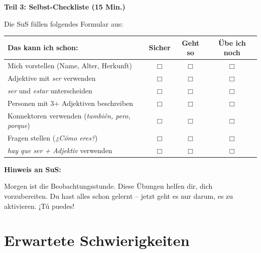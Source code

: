 \documentclass[11pt,a4paper]{article}
\begin{document}
\begin{onlinebox}
\vspace{1em}
\textbf{Teil 3: Selbst-Checkliste (15 Min.)}

Die SuS füllen folgendes Formular aus:

\begin{tabular}{|p{6cm}|c|c|c|}
\hline
\textbf{Das kann ich schon:} & \textbf{Sicher} & \textbf{Geht so} & \textbf{Übe ich noch} \\
\hline
Mich vorstellen (Name, Alter, Herkunft) & $\Box$ & $\Box$ & $\Box$ \\
\hline
Adjektive mit \textit{ser} verwenden & $\Box$ & $\Box$ & $\Box$ \\
\hline
\textit{ser} und \textit{estar} unterscheiden & $\Box$ & $\Box$ & $\Box$ \\
\hline
Personen mit 3+ Adjektiven beschreiben & $\Box$ & $\Box$ & $\Box$ \\
\hline
Konnektoren verwenden (\textit{también, pero, porque}) & $\Box$ & $\Box$ & $\Box$ \\
\hline
Fragen stellen (\textit{¿Cómo eres?}) & $\Box$ & $\Box$ & $\Box$ \\
\hline
\textit{hay que ser + Adjektiv} verwenden & $\Box$ & $\Box$ & $\Box$ \\
\hline
\end{tabular}

\vspace{1em}
\textbf{Hinweis an SuS:}

\glqq{}Morgen ist die Beobachtungsstunde. Diese Übungen helfen dir, dich vorzubereiten. Du hast alles schon gelernt -- jetzt geht es nur darum, es zu aktivieren. ¡Tú puedes!\grqq{}

\end{onlinebox}

\section{Erwartete Schwierigkeiten}
\end{document}

